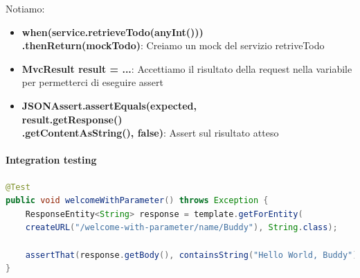 \documentclass[11pt,a4paper]{book}
\begin{document}
Notiamo:
\begin{itemize}
	\item \textbf{when(service.retrieveTodo(anyInt()))\\
		.thenReturn(mockTodo)}: Creiamo un mock del servizio retriveTodo
	\item \textbf{MvcResult result = ...}: Accettiamo il risultato della request nella variabile per permetterci di eseguire assert
	\item \textbf{JSONAssert.assertEquals(expected, \\
		result.getResponse()\\
		.getContentAsString(), false)}: Assert sul risultato atteso
\end{itemize}

\paragraph{Integration testing}
\begin{lstlisting}[language = Java]
@Test
public void welcomeWithParameter() throws Exception {
	ResponseEntity<String> response = template.getForEntity(
	createURL("/welcome-with-parameter/name/Buddy"), String.class);
	
	assertThat(response.getBody(), containsString("Hello World, Buddy"));
}
\end{lstlisting}
\end{document}
